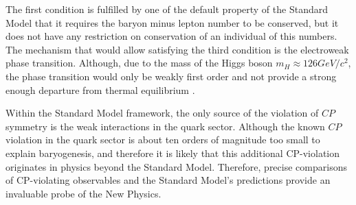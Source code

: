 The first condition is fulfilled by one of the default property of the Standard Model that it requires the baryon minus lepton number to be conserved, but it does not have any restriction on conservation of an individual of this numbers.  The mechanism that would allow satisfying the third condition is the electroweak phase transition. Although, due to the mass of the Higgs boson $m_H \approx 126 GeV/c^{2}$, the phase transition would only be weakly first order and not provide a strong enough departure from thermal equilibrium \cite{phase_transiton}. 

 Within the Standard Model framework, the only source of the violation of $CP$ symmetry is the weak interactions in the quark sector. Although the known $CP$ violation in the quark sector is about ten orders of magnitude too small to explain baryogenesis, and therefore it is likely that this additional CP-violation originates in physics beyond the Standard Model. Therefore, precise comparisons of CP-violating observables and the Standard Model's predictions provide an invaluable probe of the New Physics.
